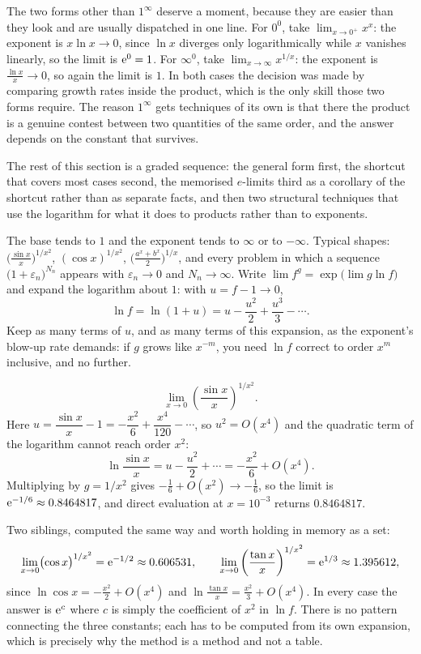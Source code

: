 The two forms other than $1^{\infty}$ deserve a moment, because they are easier than they look and are usually dispatched in one line. For $0^{0}$, take $\displaystyle\lim_{x\to0^{+}}x^{x}$: the exponent is $x\ln x\to0$, since $\ln x$ diverges only logarithmically while $x$ vanishes linearly, so the limit is $\mathrm{e}^{0}=1$. For $\infty^{0}$, take $\displaystyle\lim_{x\to\infty}x^{1/x}$: the exponent is $\tfrac{\ln x}{x}\to0$, so again the limit is $1$. In both cases the decision was made by comparing growth rates inside the product, which is the only skill those two forms require. The reason $1^{\infty}$ gets techniques of its own is that there the product is a genuine contest between two quantities of the same order, and the answer depends on the constant that survives.

The rest of this section is a graded sequence: the general form first, the shortcut that covers most cases second, the memorised $e$-limits third as a corollary of the shortcut rather than as separate facts, and then two structural techniques that use the logarithm for what it does to products rather than to exponents.

\cue The base tends to $1$ and the exponent tends to $\infty$ or to $-\infty$. Typical shapes: $\bigl(\tfrac{\sin x}{x}\bigr)^{1/x^{2}}$, $(\cos x)^{1/x^{2}}$, $\bigl(\tfrac{a^{x}+b^{x}}{2}\bigr)^{1/x}$, and every problem in which a sequence $\bigl(1+\varepsilon_{n}\bigr)^{N_{n}}$ appears with $\varepsilon_{n}\to0$ and $N_{n}\to\infty$.
\method Write $\lim f^{g}=\exp\bigl(\lim g\ln f\bigr)$ and expand the logarithm about $1$: with $u=f-1\to0$,
\[\ln f=\ln(1+u)=u-\frac{u^{2}}{2}+\frac{u^{3}}{3}-\cdots.\]
Keep as many terms of $u$, and as many terms of this expansion, as the exponent's blow-up rate demands: if $g$ grows like $x^{-m}$, you need $\ln f$ correct to order $x^{m}$ inclusive, and no further.

\begin{worked}
\[\lim_{x\to0}\left(\frac{\sin x}{x}\right)^{1/x^{2}}.\]
Here $u=\dfrac{\sin x}{x}-1=-\dfrac{x^{2}}{6}+\dfrac{x^{4}}{120}-\cdots$, so $u^{2}=O(x^{4})$ and the quadratic term of the logarithm cannot reach order $x^{2}$:
\[\ln\frac{\sin x}{x}=u-\frac{u^{2}}{2}+\cdots=-\frac{x^{2}}{6}+O(x^{4}).\]
Multiplying by $g=1/x^{2}$ gives $-\tfrac16+O(x^{2})\to-\tfrac16$, so the limit is $\mathrm{e}^{-1/6}\approx0.8464817$, and direct evaluation at $x=10^{-3}$ returns $0.8464817$.

Two siblings, computed the same way and worth holding in memory as a set:
\[\lim_{x\to0}\bigl(\cos x\bigr)^{1/x^{2}}=\mathrm{e}^{-1/2}\approx0.606531,\qquad \lim_{x\to0}\left(\frac{\tan x}{x}\right)^{1/x^{2}}=\mathrm{e}^{1/3}\approx1.395612,\]
since $\ln\cos x=-\tfrac{x^{2}}{2}+O(x^{4})$ and $\ln\tfrac{\tan x}{x}=\tfrac{x^{2}}{3}+O(x^{4})$. In every case the answer is $\mathrm{e}^{c}$ where $c$ is simply the coefficient of $x^{2}$ in $\ln f$. There is no pattern connecting the three constants; each has to be computed from its own expansion, which is precisely why the method is a method and not a table.
\end{worked}

